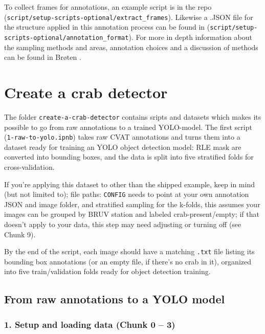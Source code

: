 \documentclass[
]{book}
\begin{document}
To collect frames for annotations, an example script is in the repo (\texttt{script/setup-scripts-optional/extract\_frames}). Likewise a .JSON file for the structure applied in this annotation process can be found in (\texttt{script/setup-scripts-optional/annotation\_format}). For more in depth information about the sampling methods and areas, annotation choices and a discussion of methods can be found in Brøten \citeyearpar{broten_crabs_2026}.

\chapter{Create a crab detector}\label{create-a-crab-detector}

The folder \texttt{create-a-crab-detector} contains sripts and datasets which makes its possible to go from raw annotations to a trained YOLO-model. The first script
(\texttt{1-raw-to-yolo.ipnb}) takes raw CVAT annotations and turns them into a dataset ready for training an YOLO object detection model: RLE mask are converted into bounding boxes, and the data is split into five stratified folds for cross-validation.

If you're applying this dataset to other than the shipped example, keep in mind (but not limited to); file paths: \texttt{CONFIG} needs to point at your own annotation JSON and image folder, and stratified sampling for the k-folds, this assumes your images can be grouped by BRUV station and labeled crab-present/empty; if that doesn't apply to your data, this step may need adjusting or turning off (see Chunk 9).

By the end of the script, each image should have a matching \texttt{.txt} file listing its bounding box annotations (or an empty file, if there's no crab in it), organized into five train/validation folds ready for object detection training.

\section{From raw annotations to a YOLO model}\label{from-raw-annotations-to-a-yolo-model}

\subsection*{1. Setup and loading data (Chunk 0 -- 3)}\label{setup-and-loading-data-chunk-0-3}
\end{document}
